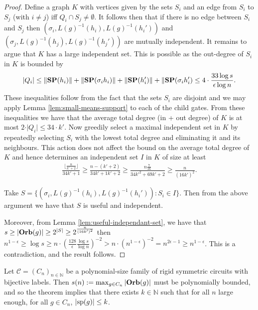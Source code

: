 \documentclass[../paper.tex]{subfiles}
\begin{document}
\begin{proof}
  Define a graph $K$ with vertices given by the sets $S_i$ and an edge from
  $S_i$ to $S_j$ (with $i \neq j$) iff $Q_i \cap S_j \neq \emptyset$. It follows
  then that if there is no edge between $S_i$ and $S_j$ then $(\sigma_i,
  L(g)^{-1}(h_i), L(g)^{-1}(h_i'))$ and $(\sigma_j, L(g)^{-1}(h_j),
  L(g)^{-1}(h_j'))$ are mutually independent. It remains to argue that $K$ has a
  large independent set. This is possible as the out-degree of $S_i$ in $K$ is
  bounded by
  \begin{align*}
    \vert Q_i \vert \leq \|\text{\textbf{SP}}(h_i) \| + \|\text{\textbf{SP}}(\sigma_i h_i) \| + \|\text{\textbf{SP}}(h_i') \| + \|\text{\textbf{SP}}(\sigma_i h_i') \leq 4 \cdot \frac{33\log s}{\epsilon \log n}.
  \end{align*}
  These inequalities follow from the fact that the sets $S_i$ are disjoint and
  we may apply Lemma \ref{lem:small-means-support} to each of the child gates.
  From these inequalities we have that the average total degree (in + out
  degree) of $K$ is at most $2 \cdot \vert Q_i \vert \leq 34 \cdot k'$. Now
  greedily select a maximal independent set in $K$ by repeatedly selecting $S_i$
  with the lowest total degree and eliminating it and its neighbours. This
  action does not affect the bound on the average total degree of $K$ and hence
  determines an independent set $I$ in $K$ of size at least
  \begin{align*}
    \frac{\lfloor \frac{n}{k' + 2} \rfloor}{34k' + 1} \geq \frac{n - (k'+2)}{34k'+1k'+2} \geq \frac{n\frac{7}{16}}{34k'^2 + 69k' +2} \geq \frac{n}{(16k')^2}.
  \end{align*}

  Take $S = \{(\sigma_i, L(g)^{-1}(h_i), L(g)^{-1}(h_i')) : S_i \in I \}$. Then
  from the above argument we have that $S$ is useful and independent.
  
  Moreover, from Lemma \ref{lem:useful-independant-set}, we have that $s \geq
  \vert \text{\textbf{Orb}}(g) \vert \geq 2^{\vert S \vert} \geq 2^{\frac{n}{(16k')^2}}$ then
  $n^{1-\epsilon} \geq \log s \geq n \cdot (\frac{128}{\epsilon}\frac{\log
    s}{\log n})^{-2} > n \cdot (n^{1-\epsilon})^{-2} = n^{2\epsilon -1} \geq
  n^{1-\epsilon}$. This is a contradiction, and the result follows.
\end{proof}
 
Let $\mathcal{C} = (C_n)_{n \in \mathbb{N}}$ be a polynomial-size family of
rigid symmetric circuits with bijective labels. Then $s(n) := \max_{g \in C_n}
\vert \text{\textbf{Orb}} (g)\vert$ must be polynomially bounded, and so the theorem implies
that there exists $k \in \mathbb{N}$ such that for all $n$ large enough, for all
$g \in C_n$, $\vert \text{sp}(g) \vert \leq k$.
\end{document}
